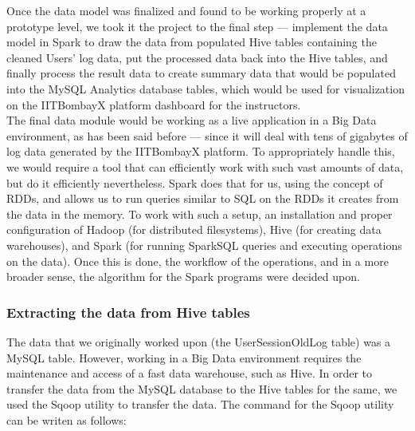 \documentclass[16pt]{report}
\begin{document}

Once the data model was finalized and found to be working properly at a prototype level, we took it the project to the final step --- implement the data model in Spark to draw the data from populated Hive tables containing the cleaned Users' log data, put the processed data back into the Hive tables, and finally process the result data to create summary data that would be populated into the MySQL Analytics database tables, which would be used for visualization on the IITBombayX platform dashboard for the instructors.\\

The final data module would be working as a live application in a Big Data environment, as has been said before --- since it will deal with tens of gigabytes of log data generated by the IITBombayX platform. To appropriately handle this, we would require a tool that can efficiently work with such vast amounts of data, but do it efficiently nevertheless. Spark does that for us, using the concept of RDDs, and allows us to run queries similar to SQL on the RDDs it creates from the data in the memory. To work with such a setup, an installation and proper configuration of Hadoop (for distributed filesystems), Hive (for creating data warehouses), and Spark (for running SparkSQL queries and executing operations on the data). Once this is done, the workflow of the operations, and in a more broader sense, the algorithm for the Spark programs were decided upon.\\

\subsubsection{Extracting the data from Hive tables}

The data that we originally worked upon (the UserSessionOldLog table) was a MySQL table. However, working in a Big Data environment requires the maintenance and access of a fast data warehouse, such as Hive. In order to transfer the data from the MySQL database to the Hive tables for the same, we used the Sqoop utility to transfer the data. The command for the Sqoop utility can be writen as follows:
\end{document}

